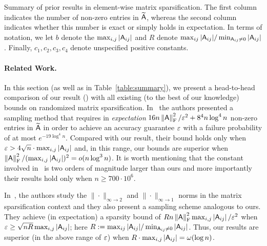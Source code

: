 \begin{center}
\begin{table}[ht]
\caption{\small Summary of prior results in element-wise matrix sparsification. The first column indicates the number of non-zero entries in $\widetilde{{\mathsf{A} }}$, whereas the second column indicates whether this number is exact or simply holds in expectation. In terms of notation, we let $b$ denote the $\max_{i,j}|{\mathsf{A} }_{ij}|$ and $R$ denote $\max_{ij} {|{\mathsf{A} }_{ij}|} / \min_{{\mathsf{A} }_{ij}\neq 0} |{\mathsf{A} }_{ij}|$. Finally, $c_1,c_2,c_3,c_4$ denote unspecified positive constants.}\label{table:summary}
\end{table}
\end{center}
\paragraph{Related Work.}
In this section (as well as in Table~\ref{table:summary}), we present a head-to-head comparison of our result (\cite{matrix:sparsification:IPL2011}) with all existing (to the best of our knowledge) bounds on randomized matrix sparsification. In~\cite{matrix:sparsification:AM01,matrix:sparsification:optas} the authors presented a sampling method that requires in \emph{expectation} $16 n \left\|{\mathsf{A} }\right\|_{\textrm{F}}^2 / \varepsilon^2  + 8^4 n\log^4 n$ non-zero entries in $\widetilde{{\mathsf{A} }}$ in order to achieve an accuracy guarantee $\varepsilon$ with a failure probability of at most $e^{-19\log^4 n}$. Compared with our result, their bound holds only when $\varepsilon > 4\sqrt{n} \cdot \max_{i,j}\left|{\mathsf{A} }_{ij}\right|$ and, in this range, our bounds are superior when $\left\|{\mathsf{A} }\right\|_{\textrm{F}}^2 / (\max_{i,j}\left|{\mathsf{A} }_{ij}\right|)^2=o(n\log^3 n)$. It is worth mentioning that the constant involved in~\cite{matrix:sparsification:AM01,matrix:sparsification:optas} is two orders of magnitude larger than ours and more importantly their results hold only when $n\geq 700 \cdot 10^6$.
%

%
In~\cite{matrix:sparsification:Tropp}, the authors study the $\|\cdot\|_{\infty \rightarrow 2}$ and $\|\cdot\|_{\infty \rightarrow 1}$ norms in the matrix sparsification context and they also present a sampling scheme analogous to ours. They achieve (in expectation) a sparsity bound of $R n\left\|{\mathsf{A} }\right\|_{\textrm{F}}^2 \max_{i,j}\left|{\mathsf{A} }_{ij}\right|  /\varepsilon^2$  when $\varepsilon \geq \sqrt{nR}\max_{i,j} \left|{\mathsf{A} }_{ij}\right|$; here $R:=\max_{ij} {\left|{\mathsf{A} }_{ij}\right|} / \min_{{\mathsf{A} }_{ij}\neq 0} \left|{\mathsf{A} }_{ij}\right|$. Thus, our results are superior (in the above range of $\varepsilon$) when $R\cdot \max_{i,j} \left|{\mathsf{A} }_{ij}\right| =\omega( \log n)$.
%

